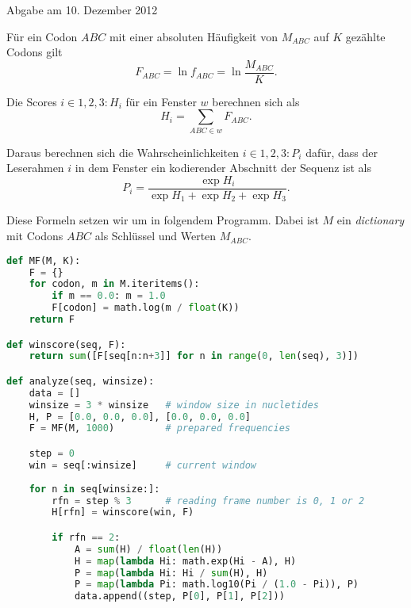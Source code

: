 \documentclass{homework}
\date{Montag, dem 3. Dezember 2012}
\author{Stefan Meißner (4279113) und Niels Hoppe (4356370)}
\begin{document}
\maketitle
\begin{enumerate} 


Abgabe am 10. Dezember 2012


Für ein Codon $ABC$ mit einer absoluten Häufigkeit von $M_{ABC}$ auf $K$
gezählte Codons gilt
$$F_{ABC} = \ln f_{ABC} = \ln \frac{M_{ABC}}{K}.$$

Die Scores $i \in {1,2,3}: H_i$ für ein Fenster $w$ berechnen sich als
$$H_i = \sum_{ABC \in w} F_{ABC}.$$

Daraus berechnen sich die Wahrscheinlichkeiten $i \in {1,2,3}: P_i$ dafür, dass
der Leserahmen $i$ in dem Fenster ein kodierender Abschnitt der Sequenz ist als
$$P_i = \frac{\exp H_i}{\exp H_1 + \exp H_2 + \exp H_3}.$$


Diese Formeln setzen wir um in folgendem Programm. Dabei ist $M$ ein
\textit{dictionary} mit Codons $ABC$ als Schlüssel und Werten $M_{ABC}$.

\begin{lstlisting}[language=python]
def MF(M, K):
	F = {}
	for codon, m in M.iteritems():
		if m == 0.0: m = 1.0
		F[codon] = math.log(m / float(K))
	return F

def winscore(seq, F):
	return sum([F[seq[n:n+3]] for n in range(0, len(seq), 3)])

def analyze(seq, winsize):
	data = []
	winsize = 3 * winsize	# window size in nucletides
	H, P = [0.0, 0.0, 0.0], [0.0, 0.0, 0.0]
	F = MF(M, 1000)			# prepared frequencies

	step = 0
	win = seq[:winsize]		# current window
	
	for n in seq[winsize:]:
		rfn = step % 3		# reading frame number is 0, 1 or 2
		H[rfn] = winscore(win, F)

		if rfn == 2:
			A = sum(H) / float(len(H))
			H = map(lambda Hi: math.exp(Hi - A), H)
			P = map(lambda Hi: Hi / sum(H), H)
			P = map(lambda Pi: math.log10(Pi / (1.0 - Pi)), P)
			data.append((step, P[0], P[1], P[2]))


\end{lstlisting}
\end{enumerate}
\end{document}
